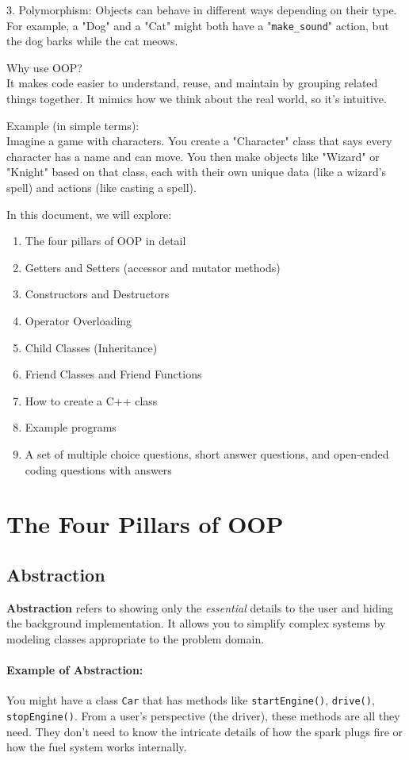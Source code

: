 \documentclass[a4paper,12pt]{article}
\begin{document}
3. Polymorphism: Objects can behave in different ways depending on their type. For example, a "Dog" and a "Cat" might both have a "\verb|make_sound|" action, but the dog barks while the cat meows.

Why use OOP?\\
It makes code easier to understand, reuse, and maintain by grouping related things together.
It mimics how we think about the real world, so it’s intuitive.

Example (in simple terms):\\
Imagine a game with characters. You create a "Character" class that says every character has a name and can move. You then make objects like "Wizard" or "Knight" based on that class, each with their own unique data (like a wizard’s spell) and actions (like casting a spell).

\noindent
In this document, we will explore:
\begin{enumerate}
    \item The four pillars of OOP in detail
    \item Getters and Setters (accessor and mutator methods)
    \item Constructors and Destructors
    \item Operator Overloading
    \item Child Classes (Inheritance)
    \item Friend Classes and Friend Functions
    \item How to create a C++ class
    \item Example programs
    \item A set of multiple choice questions, short answer questions, and open-ended coding questions with answers
\end{enumerate}

\newpage

\section{The Four Pillars of OOP}
\subsection{Abstraction}
\textbf{Abstraction} refers to showing only the \textit{essential} details to the user and hiding the background implementation. It allows you to simplify complex systems by modeling classes appropriate to the problem domain.

\paragraph{Example of Abstraction:} 
You might have a class \texttt{Car} that has methods like \texttt{startEngine()}, \texttt{drive()}, \texttt{stopEngine()}. From a user's perspective (the driver), these methods are all they need. They don’t need to know the intricate details of how the spark plugs fire or how the fuel system works internally.
\end{document}
